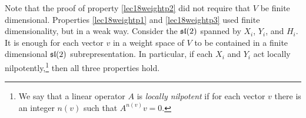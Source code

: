 \begin{enumerate}
 \end{enumerate}
 \begin{remark}\label{lec18Rmk:findim}
   Note that the proof of property \ref{lec18weightp2} did not require that $V$ be
   finite dimensional. Properties \ref{lec18weightp1} and \ref{lec18weightp3} used
   finite dimensionality, but in a weak way. Consider the $\sl(2)$ spanned by $X_i$,
   $Y_i$, and $H_i$. It is enough for each vector $v$ in a weight space of $V$ to be
   contained in a finite dimensional $\sl(2)$ subrepresentation. In particular, if
   each $X_i$ and $Y_i$ act locally nilpotently,\footnote{We say that a linear
   operator $A$ is \emph{locally nilpotent} if for each vector $v$ there is an integer
   $n(v)$ such that $A^{n(v)}v=0$.} then all three properties hold.
 \end{remark}
